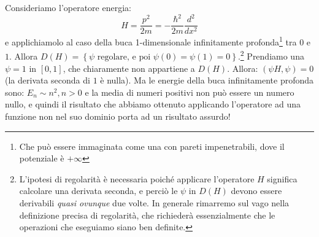 \documentclass[FisicaTeorica.tex]{subfiles}
\begin{document}
	\begin{es}
	Consideriamo l'operatore energia: 
	\[H=\frac{p^2}{2m}=-\frac{\hbar^2}{2m}\frac{d^2}{dx^2}\]
	e applichiamolo al caso della buca 1-dimensionale infinitamente profonda\footnote{Che può essere immaginata come una  con pareti impenetrabili, dove il potenziale è $+\infty$} tra $0$ e $1$.
	Allora $D\left(H\right)=\left\{\psi\text{\ regolare,\ e\ poi\ } \psi\left(0\right)=\psi\left(1\right)=0\right\}$.\footnote{L'ipotesi di regolarità è necessaria poiché applicare l'operatore $H$ significa calcolare una derivata seconda, e perciò le $\psi$ in $D(H)$ devono essere derivabili \textit{quasi ovunque} due volte. In generale rimarremo sul vago nella definizione precisa di regolarità, che richiederà essenzialmente che le operazioni che eseguiamo siano ben definite.}
	Prendiamo una $\psi=1$ in $[0,1]$, che chiaramente non appartiene a $D(H)$. 
	Allora:
	$\left(\psi H,\psi\right)=0$ (la derivata seconda di $1$ è nulla).
	Ma le energie della buca infinitamente profonda sono: $E_n\sim n^2, n>0$ e la media di numeri positivi non può essere un numero nullo, e quindi il risultato che abbiamo ottenuto applicando l'operatore ad una funzione non nel suo dominio porta ad un risultato assurdo!
	\end{es}
\end{document}
